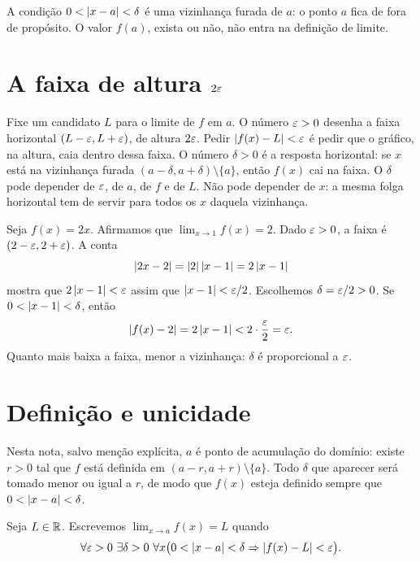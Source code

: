 \documentclass[11pt,a4paper]{article}
\begin{document}
A condi\c{c}\~ao $0<\left\lvert x-a \right\rvert<\delta$ \'e uma vizinhan\c{c}a furada de $a$: o ponto $a$ fica de fora de prop\'osito. O valor $f(a)$, exista ou n\~ao, n\~ao entra na defini\c{c}\~ao de limite.

\section{A faixa de altura $2\varepsilon$}
\label{sec:intuicao}

\begin{intuicao}
Fixe um candidato $L$ para o limite de $f$ em $a$. O n\'umero $\varepsilon>0$ desenha a faixa horizontal $(L-\varepsilon,L+\varepsilon)$, de altura $2\varepsilon$. Pedir $\left\lvert f(x)-L \right\rvert<\varepsilon$ \'e pedir que o gr\'afico, na altura, caia dentro dessa faixa. O n\'umero $\delta>0$ \'e a resposta horizontal: se $x$ est\'a na vizinhan\c{c}a furada $(a-\delta,a+\delta)\setminus\{a\}$, ent\~ao $f(x)$ cai na faixa. O $\delta$ pode depender de $\varepsilon$, de $a$, de $f$ e de $L$. N\~ao pode depender de $x$: a mesma folga horizontal tem de servir para todos os $x$ daquela vizinhan\c{c}a.
\end{intuicao}

\begin{exemplo}
\label{ex:2x}
Seja $f(x)=2x$. Afirmamos que $\lim_{x\to 1}f(x)=2$. Dado $\varepsilon>0$, a faixa \'e $(2-\varepsilon,2+\varepsilon)$. A conta
\[
\left\lvert 2x-2 \right\rvert=\left\lvert 2 \right\rvert\left\lvert x-1 \right\rvert=2\left\lvert x-1 \right\rvert
\]
mostra que $2\left\lvert x-1 \right\rvert<\varepsilon$ assim que $\left\lvert x-1 \right\rvert<\varepsilon/2$. Escolhemos $\delta=\varepsilon/2>0$. Se $0<\left\lvert x-1 \right\rvert<\delta$, ent\~ao
\[
\left\lvert f(x)-2 \right\rvert=2\left\lvert x-1 \right\rvert<2\cdot\frac{\varepsilon}{2}=\varepsilon.
\]
Quanto mais baixa a faixa, menor a vizinhan\c{c}a: $\delta$ \'e proporcional a $\varepsilon$.
\end{exemplo}


\section{Defini\c{c}\~ao e unicidade}
\label{sec:def}

Nesta nota, salvo men\c{c}\~ao expl\'icita, $a$ \'e ponto de acumula\c{c}\~ao do dom\'inio: existe $r>0$ tal que $f$ est\'a definida em $(a-r,a+r)\setminus\{a\}$. Todo $\delta$ que aparecer ser\'a tomado menor ou igual a $r$, de modo que $f(x)$ esteja definido sempre que $0<\left\lvert x-a \right\rvert<\delta$.

\begin{definicao}
\label{def:limite}
Seja $L\in\mathbb{R}$. Escrevemos $\lim_{x\to a}f(x)=L$ quando
\[
\forall\eps>0\ \exists\delta>0\ \forall x\bigl(0<\abs{x-a}<\delta \Rightarrow \abs{f(x)-L}<\eps\bigr).
\]
\end{definicao}
\end{document}
